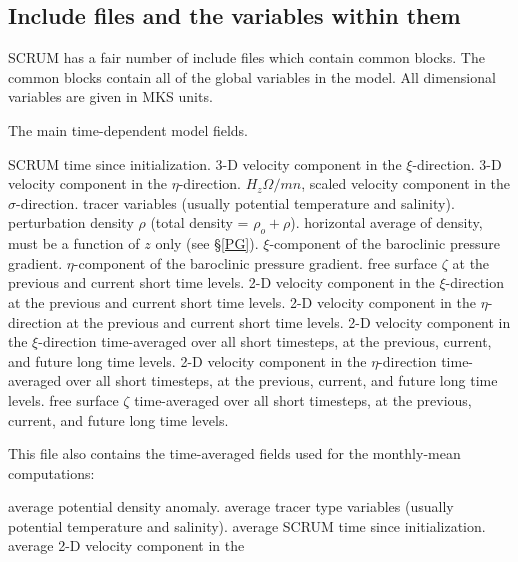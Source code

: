 
\subsection{Include files and the variables within them}
\label{Vars}
SCRUM has a fair number of include files which contain common blocks.
The common blocks contain all of the global variables in the model.
All dimensional variables are given in MKS units.
\begin{klist}
      The main time-dependent model fields.
    \begin{klist}
           SCRUM time since initialization.
              3-D velocity component in the $\xi$-direction.
              3-D velocity component in the $\eta$-direction.
              $H_z \Omega/mn$, scaled velocity component in
the $\sigma$-direction.
              tracer variables (usually potential
   temperature and salinity).
            perturbation density $\rho$ (total density =
$\rho_o + \rho$).
         horizontal average of density, must be a
function of $z$ only (see \S\ref{PG}).
           $\xi$-component of the baroclinic
pressure gradient.
           $\eta$-component of the baroclinic
pressure gradient.
           free surface $\zeta$
   at the previous and current short time levels.
           2-D velocity component in the $\xi$-direction
   at the previous and current short time levels.
           2-D velocity component in the $\eta$-direction
   at the previous and current short time levels.
           2-D velocity component in the $\xi$-direction
   time-averaged over all short timesteps, at the previous, current, and
   future long time levels.
           2-D velocity component in the $\eta$-direction
   time-averaged over all short timesteps, at the previous, current, and
   future long time levels.
           free surface $\zeta$
   time-averaged over all short timesteps, at the previous, current, and
   future long time levels.
    \end{klist}
This file also contains the time-averaged fields used for the
monthly-mean computations:
    \begin{klist}
           average potential density anomaly.
             average tracer type variables (usually
  potential temperature and salinity).
          average SCRUM time since initialization.
           average 2-D velocity component in the

\end{klist}
\end{klist}
